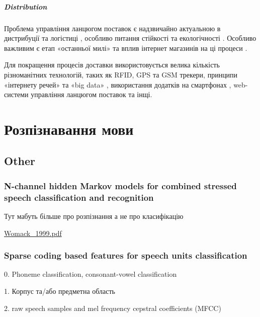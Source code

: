 \paragraph{Distribution}

Проблема управління ланцюгом поставок є надзвичайно актуальною в дистрибуції та логістиці \cite{Speranza_2018}, особливо питання стійкості \cite{Koberg_2018,Jia_2018,Bastas_2019,Wen_2018,Sullet_2018} та екологічності \cite{Tseng_2019,Papetti_2019,Hoehne_2017}. Особливо важливим є етап «останньої милі» \cite{Baldi_2018,Gdowska_2018,Boysen_2018,Hoehne_2017,Pronello_2017,Cook_2017} та вплив інтернет магазинів на ці процеси \cite{Allen_2018,Cardenas_2017}.

Для покращення процесів доставки використовується велика кількість різноманітних технологій, таких як RFID\cite{Prasanna_2012}, GPS \cite{Stopher_2018,Prasanna_2012} та GSM \cite{Prasanna_2012} трекери, принципи «інтернету речей» \cite{Liu_2018} та «big data» \cite{Govindan_2018}, використання додатків на смартфонах \cite{Stopher_2018}, web-системи управління ланцюгом поставок \cite{Papetti_2019} та інщі.


\chapter{Розпізнавання мови}


\section{Other}

\subsection{N-channel hidden Markov models for combined stressed speech classification and recognition}

Тут мабуть більше про розпізнання а не про класифікацію

\url{Womack_1999.pdf}\cite{Womack_1999}

\subsection{Sparse coding based features for speech units classification}

0. Phoneme classification, consonant-vowel classification

1. Корпус та/або предметна область

2. raw speech samples and mel frequency cepstral coefficients (MFCC)

